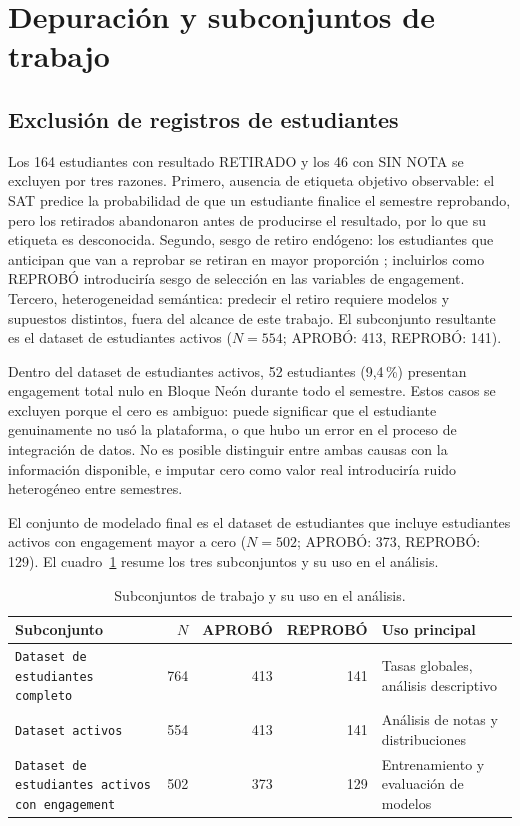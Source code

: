 \documentclass[12pt, letterpaper, openany]{report}
\begin{document}
\section{Depuración y subconjuntos de trabajo}
\label{sec:depuracion}

\subsection{Exclusión de registros de estudiantes}

Los 164 estudiantes con resultado RETIRADO y los 46 con SIN NOTA se excluyen por tres razones. Primero, ausencia de etiqueta objetivo observable: el SAT predice la probabilidad de que un estudiante finalice el semestre reprobando, pero los retirados abandonaron antes de producirse el resultado, por lo que su etiqueta es desconocida. Segundo, sesgo de retiro endógeno: los estudiantes que anticipan que van a reprobar se retiran en mayor proporción \cite{Tinto1993}; incluirlos como REPROBÓ introduciría sesgo de selección en las variables de engagement. Tercero, heterogeneidad semántica: predecir el retiro requiere modelos y supuestos distintos, fuera del alcance de este trabajo. El subconjunto resultante es el dataset de estudiantes activos ($N = 554$; APROBÓ: 413, REPROBÓ: 141).

Dentro del dataset de estudiantes activos, 52 estudiantes (9,4\,\%) presentan engagement total nulo en Bloque Neón durante todo el semestre. Estos casos se excluyen porque el cero es ambiguo: puede significar que el estudiante genuinamente no usó la plataforma, o que hubo un error en el proceso de integración de datos. No es posible distinguir entre ambas causas con la información disponible, e imputar cero como valor real introduciría ruido heterogéneo entre semestres.

El conjunto de modelado final es el dataset de estudiantes que incluye estudiantes activos con engagement mayor a cero ($N = 502$; APROBÓ: 373, REPROBÓ: 129). El cuadro~\ref{tab:subsets} resume los tres subconjuntos y su uso en el análisis.

\begin{table}[htbp]
  \centering
  \caption{Subconjuntos de trabajo y su uso en el análisis.}
  \label{tab:subsets}
  \small
  \begin{tabularx}{\textwidth}{XrrrX}
    \toprule
    Subconjunto & $N$ & APROBÓ & REPROBÓ & Uso principal \\
    \midrule
    \texttt{Dataset de estudiantes completo} & 764 & 413 & 141 & Tasas globales, análisis descriptivo \\ \addlinespace
    \texttt{Dataset activos} & 554 & 413 & 141 & Análisis de notas y distribuciones \\ \addlinespace
    \texttt{Dataset de estudiantes activos con engagement} & 502 & 373 & 129 & Entrenamiento y evaluación de modelos \\
    \bottomrule
  \end{tabularx}
\end{table}
\end{document}
